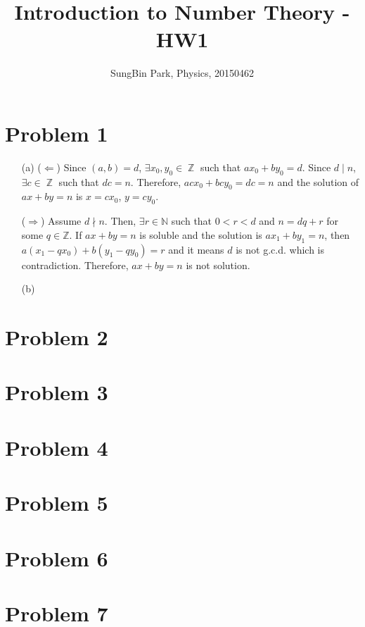 \documentclass{article}
\DeclareMathOperator{\zz}{\mathbb{Z}}
\begin{document}
\title{Introduction to Number Theory - HW1}
\author{SungBin Park, Physics, 20150462} 

 \maketitle

\section*{Problem 1}
\begin{enumerate}
    \item[(a)] ($\Leftarrow$) Since $(a,b)=d$, $\exists x_0, y_0\in \zz$ such that $ax_0+by_0=d$. Since $d\mid n$, $\exists c\in \zz$ such that $dc=n$. Therefore, $acx_0+bcy_0=dc=n$ and the solution of $ax+by=n$ is $x=cx_0$, $y=cy_0$.
    
    ($\Rightarrow$) Assume $d\nmid n$. Then, $\exists r\in \mathbb{N}$ such that $0<r<d$ and $n=dq+r$ for some $q\in \mathbb{Z}$. If $ax+by=n$ is soluble and the solution is $ax_1+by_1=n$, then $a(x_1-qx_0)+b(y_1-qy_0)=r$ and it means $d$ is not g.c.d. which is contradiction. Therefore, $ax+by=n$ is not solution.
    \item[(b)] 
\end{enumerate}
\section*{Problem 2}

\section*{Problem 3}

\section*{Problem 4}

\section*{Problem 5}

\section*{Problem 6}

\section*{Problem 7}
\end{document}
